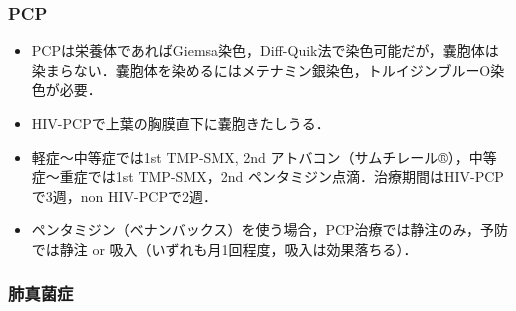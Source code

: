 \subsubsection{PCP}

\begin{itemize}
\item PCPは栄養体であればGiemsa染色，Diff-Quik法で染色可能だが，嚢胞体は染まらない．嚢胞体を染めるにはメテナミン銀染色，トルイジンブルーO染色が必要．
\item HIV-PCPで上葉の胸膜直下に嚢胞きたしうる．
\item 軽症〜中等症では1st TMP-SMX, 2nd アトバコン（サムチレール®），中等症〜重症では1st TMP-SMX，2nd ペンタミジン点滴．治療期間はHIV-PCPで3週，non HIV-PCPで2週．
\item ペンタミジン（ベナンバックス）を使う場合，PCP治療では静注のみ，予防では静注 or 吸入（いずれも月1回程度，吸入は効果落ちる）．
\end{itemize}


\subsubsection{肺真菌症}

